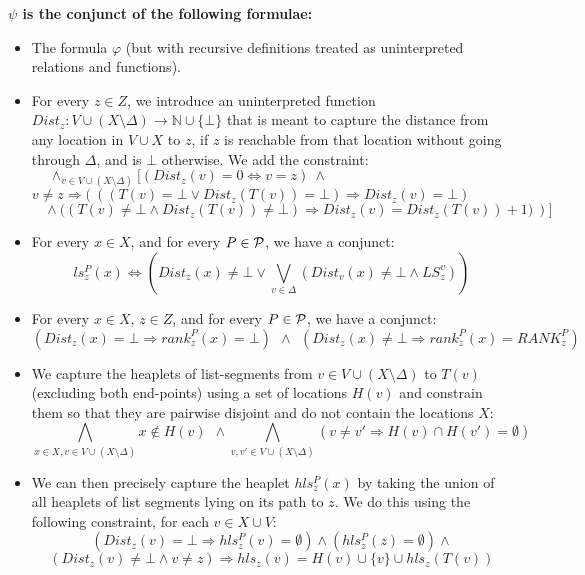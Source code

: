 \medskip
\noindent 
{\bf $\psi$ is the conjunct of the following formulae:}
\begin{itemize}
	\item The formula $\varphi$ (but with recursive definitions treated as uninterpreted relations and functions).
	\item For every $z \in Z$, we introduce an uninterpreted function $Dist_z: V \cup (X \setminus \Delta) \longrightarrow \mathbb{N} \cup \{\bot\}$ that
             is meant to capture the distance from any location in $V \cup X$ to $z$, if $z$ is reachable from
               that location without going through $\Delta$, and is $\bot$ otherwise. We add the constraint:
          $$\wedge_{v \in V\cup (X\setminus \Delta)} \big[ (Dist_z(v)\!=\!0 \Leftrightarrow v=z) ~\wedge ~~~~~~~~~~~~~~~~~~~~~~~~~~~~~~~~~~~~~~~~~~~~~~~~~~~~~~$$
          $$ v \!\not =\! z \Rightarrow \big(~\left( (T(v)\!=\!\bot \vee Dist_z(T(v))\!=\!\bot) \Rightarrow Dist_z(v) \!=\! \bot
                 \right)~~~~~~~~~~~~~~~$$
          $$  ~~~~~  \left. \wedge ~((T(v) \not = \bot \wedge Dist_z(T(v)) \not = \bot) \Rightarrow Dist_z(v) = Dist_z(T(v))+1
                \big) ~\right)\big] $$
              
	\item For every $x \in X$, and for every $P \in {\cal P}$, we have a conjunct:
		     $$ls_z^P(x) \Leftrightarrow (Dist_z(x)\not= \bot \vee \bigvee_{v \in \Delta} (Dist_v(x) \not = \bot
		       \wedge LS_z^v))$$
		     
    \item For every $x \in X$, $z \in Z$, and for every $P \in {\cal P}$, we have a conjunct:
             $$ \left( Dist_z(x) \!=\! \bot \Rightarrow rank_z^P\!(x)\!=\!\bot\right) ~~\wedge~~ 
               \left( Dist_z(x) \!\not =\! \bot \Rightarrow rank_z^P\!(x)\!=\!RANK_z^P \right)$$
               
    \item We capture the heaplets of list-segments from $v \in V \cup (X \setminus \Delta)$ to $T(v)$ (excluding both
              end-points) using a set
             of locations $H(v)$
             and constrain them so that they are pairwise disjoint and do not contain the locations $X$:
             $$ \bigwedge_{x \in X, v \in V \cup (X \setminus \Delta)} x \not \in H(v) ~~\wedge 
             \bigwedge_{v,v' \in V \cup (X \setminus \Delta)} (v \!\not =\! v' \Rightarrow H(v) \cap H(v') = \emptyset)$$  
    
    \item We can then precisely capture the heaplet $hls_z^P(x)$ by taking the union of all heaplets of
           list segments lying on its path to $z$. We do this using the following constraint, for each
           $v \in X \cup V$:
           $$(Dist_z(v)=\bot \Rightarrow hls_z^P (v) = \emptyset) \wedge (hls_z^P(z)= \emptyset)\wedge $$
           $$(Dist_z(v) \not = \bot \wedge v \not = z) \Rightarrow hls_z(v)= H(v) \cup \{v\} \cup hls_z(T(v))$$

\end{itemize}

